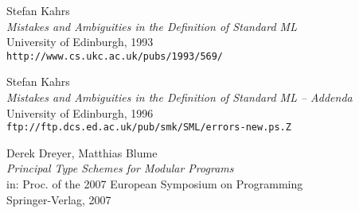 \documentclass{article}
\newcommand{\void}[1]{}
\begin{document}
\begin{appendix}
\begin{thebibliography}{MTHM97}
Stefan Kahrs \\
{\it Mistakes and Ambiguities in the Definition of Standard ML} \\
University of Edinburgh, 1993 \\
{\small\tt{http://www.cs.ukc.ac.uk/pubs/1993/569/}}

Stefan Kahrs \\
{\it Mistakes and Ambiguities in the Definition of Standard ML -- Addenda} \\
University of Edinburgh, 1996 \\
{\small\tt{ftp://ftp.dcs.ed.ac.uk/pub/smk/SML/errors-new.ps.Z}}

Derek Dreyer, Matthias Blume \\
{\it Principal Type Schemes for Modular Programs} \\
in: Proc. of the 2007 European Symposium on Programming \\
Springer-Verlag, 2007

\void{
\bibitem[DHCK06]{typeclasses}
Derek Dreyer, Robert Harper, Manuel Chakravarty, Gabriele Keller \\
{\it Modular Type Classes} \\
Draft, 2006 \\
{\small\tt{http://www.cs.cmu.edu/~rwh/papers/mtc/apr06.pdf}}
}

\end{thebibliography}


\end{appendix}

\end{document}
